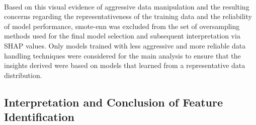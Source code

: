 \documentclass[12pt,a4paper]{report}
\begin{document}
\\
Based on this visual evidence of aggressive data manipulation and the resulting concerns regarding the representativeness of the training data and the reliability of model performance, \gls{smote}-\gls{enn} was excluded from the set of oversampling methods used for the final model selection and subsequent interpretation via SHAP values. Only models trained with less aggressive and more reliable data handling techniques were considered for the main analysis to ensure that the insights derived were based on models that learned from a representative data distribution.

\pagebreak
\subsection{Interpretation and Conclusion of Feature Identification}
\label{subsec:feature_identification}
\end{document}
